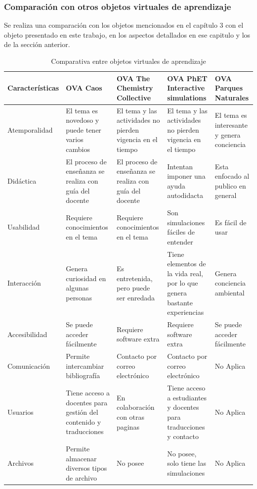 \documentclass[letterpaper, 11pt, oneside]{article}
\theoremstyle{definition}
\theoremstyle{remark}
\begin{document}
\subsubsection{Comparación con otros objetos virtuales de aprendizaje}

Se realiza una comparación con los objetos mencionados en el capítulo 3 con el objeto presentado en este trabajo, en los aspectos detallados en ese capitulo y los de la sección anterior.

\begin{table}[htbp]

\begin{center}
\begin{tabular}{|p{2.5cm}|p{2.5cm}|p{2.8cm}|p{3.2cm}|p{2cm}|}
\hline
\multicolumn{1}{|c|}{\textbf{Características}} & \textbf{OVA Caos} & OVA The Chemistry Collective & OVA PhET Interactive simulations & OVA Parques Naturales \\ \hline
Atemporalidad & El tema es novedoso y puede tener varios cambios & El tema y las actividades no pierden vigencia en el tiempo & El tema y las actividades no pierden vigencia en el tiempo & El tema es interesante y genera conciencia \\ \hline
Didáctica & El proceso de enseñanza se realiza con guía del docente & El proceso de enseñanza se realiza con guía del docente & Intentan imponer una ayuda autodidacta & Esta enfocado al publico en general \\ \hline
Usabilidad & Requiere conocimientos en el tema & Requiere conocimientos en el tema & Son simulaciones fáciles de entender & Es fácil de usar \\ \hline
Interacción & Genera curiosidad en algunas personas & Es entretenida, pero puede ser enredada & Tiene elementos de la vida real, por lo que genera bastante experiencias & Genera conciencia ambiental \\ \hline
Accesibilidad & Se puede acceder fácilmente & Requiere software extra & Requiere software extra & Se puede acceder fácilmente \\ \hline
Comunicación & Permite intercambiar bibliografía & Contacto por correo electrónico & Contacto por correo electrónico & No Aplica \\ \hline
Usuarios & Tiene acceso a docentes para gestión del contenido y traducciones & En colaboración con otras paginas & Tiene acceso a estudiantes y docentes  para traducciones y contacto & No Aplica \\ \hline
Archivos & Permite almacenar diversos tipos de archivo & No posee & No posee, solo tiene las simulaciones & No Aplica \\ \hline
\end{tabular}
\end{center}
\caption{Comparativa entre objetos virtuales de aprendizaje}
\label{comparacion}
\end{table}
\end{document}
